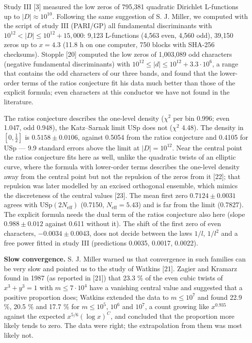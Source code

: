 \documentclass[
  10pt,
]{article}
\begin{document}
Study III {[}3{]} measured the low zeros of 795,381 quadratic Dirichlet
L-functions up to \(|D| \approx 10^{10}\). Following the same suggestion
of S. J. Miller, we computed with the script of study III (PARI/GP) all
fundamental discriminants with \(10^{12} < |D| \le 10^{12} + 15{,}000\):
9,123 L-functions (4,563 even, 4,560 odd), 39,150 zeros up to
\(x = 4.3\) (11.8 h on one computer, 750 blocks with SHA-256 checksums).
Stopple {[}20{]} computed the low zeros of 1,003,089 odd characters
(negative fundamental discriminants) with
\(10^{12} \le |d| \le 10^{12} + 3.3\cdot10^6\), a range that contains
the odd characters of our three bands, and found that the lower-order
terms of the ratios conjecture fit his data much better than those of
the explicit formula; even characters at this conductor we have not
found in the literature.

The ratios conjecture describes the one-level density (\(\chi^2\) per
bin 0.996; even 1.047, odd 0.948), the Katz--Sarnak limit USp does not
(\(\chi^2\) 4.48). The density in \([0, \frac12]\) is
\(0.5158 \pm 0.0106\), against 0.5054 from the ratios conjecture and
0.4105 for USp --- 9.9 standard errors above the limit at
\(|D| = 10^{12}\). Near the central point the ratios conjecture fits
here as well, unlike the quadratic twists of an elliptic curve, where
the formula with lower-order terms describes the one-level density away
from the central point but not the repulsion of the zeros from it
{[}22{]}; that repulsion was later modelled by an excised orthogonal
ensemble, which mimics the discreteness of the central values {[}23{]}.
The mean first zero \(0.7124 \pm 0.0031\) agrees with
USp\((2N_{\mathrm{eff}})\) (0.7150, \(N_{\mathrm{eff}} = 5.43\)) and is
far from the limit (0.7827). The explicit formula needs the dual term of
the ratios conjecture also here (slope \(0.988 \pm 0.012\) against 0.611
without it). The shift of the first zero of even characters,
\(-0.0034 \pm 0.0043\), does not decide between the laws \(1/l\),
\(1/l^2\) and a free power fitted in study III (predictions 0.0035,
0.0017, 0.0022).

\textbf{Slow convergence.} S. J. Miller warned us that convergence in
such families can be very slow and pointed us to the study of Watkins
{[}21{]}. Zagier and Kramarz found in 1987 (as reported in {[}21{]})
that 23.3 \% of the even cubic twists of \(x^3 + y^3 = 1\) with
\(m \le 7\cdot10^4\) have a vanishing central value and suggested that a
positive proportion does; Watkins extended the data to \(m \le 10^7\)
and found 22.9 \%, 20.5 \% and 17.7 \% for \(m \le 10^5\), \(10^6\) and
\(10^7\), a count growing like \(x^{0.935}\) against the expected
\(x^{5/6}(\log x)^C\), and concluded that the proportion more likely
tends to zero. The data were right; the extrapolation from them was most
likely not.
\end{document}
